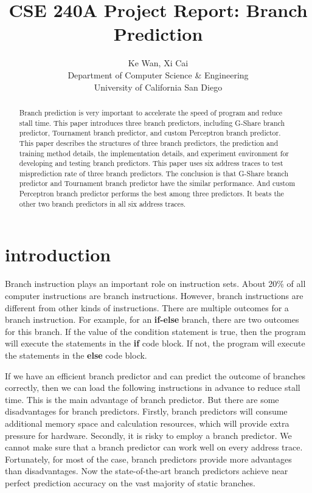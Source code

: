 \documentclass[conference]{IEEEtran}
\title{CSE 240A Project Report: Branch Prediction}
\author{Ke Wan, Xi Cai \\
Department of Computer Science \& Engineering \\
University of California San Diego

}
\begin{document}
\maketitle
\thispagestyle{firstpage}
\pagestyle{plain}




\begin{abstract}

Branch prediction is very important to accelerate the speed of program and reduce stall time. This paper introduces three branch predictors, including G-Share branch predictor, Tournament branch predictor, and custom Perceptron branch predictor. 
This paper describes the structures of three branch predictors, the prediction and training method details, the implementation details, and experiment environment for developing and testing branch predictors. This paper uses six 
address traces to test misprediction rate of three branch predictors. The conclusion is that G-Share branch predictor and Tournament branch predictor have the similar performance. And custom Perceptron branch predictor performs 
the best among three predictors. It beats the other two branch predictors in all six address traces. 

\end{abstract}

\section{introduction}
Branch instruction plays an important role on instruction sets. About 20\% of all computer instructions are branch instructions. However, branch instructions are
different from other kinds of instructions. There are multiple outcomes for a branch instruction. For example, for an \textbf{if-else} branch, there are two outcomes for this branch. 
If the value of the condition statement is true, then the program will execute the statements in the \textbf{if} code block. If not, the program will execute the statements
in the \textbf{else} code block. 

If we have an efficient branch predictor and can predict the outcome of branches correctly, then we can load the following instructions in advance to reduce stall time. 
This is the main advantage of branch predictor. But there are some disadvantages for branch predictors. Firstly, branch predictors will consume additional memory space and calculation resources, which will provide 
extra pressure for hardware. Secondly, it is risky to employ a branch predictor. We cannot make sure that a branch predictor can work well on every address trace. Fortunately, for most of the case, branch predictors 
provide more advantages than disadvantages. Now the state-of-the-art branch predictors achieve near perfect prediction accuracy on the vast majority of static branches. 
\end{document}
